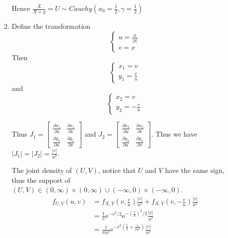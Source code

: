 \documentclass{article}
\begin{document}
\begin{enumerate}[leftmargin = 0 em, label = \arabic*., font = \bfseries]
\begin{enumerate}
Hence $\frac{X}{X+y} = U \sim Cauchy(x_0 = \frac{1}{2}, \gamma = \frac{1}{2})$


\item 
Define the transformation
\[\begin{cases}
	u = \frac{x}{|y|}\\
	v = x
\end{cases}\]
Then 
\[\begin{cases}
	x_1 = v\\
	y_1 = \frac{v}{u}
\end{cases}\]
and 
\[\begin{cases}
	x_2 = v\\
	y_2 = -\frac{v}{u}
\end{cases}\]


Thus $J_1 = \begin{bmatrix}
	\frac{\partial x_1}{\partial u} & \frac{\partial x_1}{\partial v}\\
	\frac{\partial y_1}{\partial u} & \frac{\partial y_1}{\partial v}
\end{bmatrix}$
and $J_2 = \begin{bmatrix}
	\frac{\partial x_2}{\partial u} & \frac{\partial x_2}{\partial v}\\
	\frac{\partial y_2}{\partial u} & \frac{\partial y_2}{\partial v}
\end{bmatrix}$. Thus we have $|J_1| = |J_2| = \frac{|v|}{u^2}$.

The joint density of $(U,V)$, notice that $U$ and $V$ have the same sign, thus the support of $(U,V) \in (0, \infty)\times(0, \infty) \cup (-\infty, 0)\times(-\infty, 0)$.
\begin{align*}
f_{U,V}(u,v) & = f_{X,Y}(v, \frac{v}{u}) \frac{|v|}{u^2} + f_{X,Y}(v, -\frac{v}{u})\frac{|v|}{u^2}\\
& = \frac{1}{\pi} \mathrm{e}^{- v^2 /2} \mathrm{e}^{-(\frac{v}{u})^2/2} \frac{|v|}{u^2}\\
& = \frac{1}{\pi u^2} \mathrm{e}^{-v^2 (\frac{1}{2} + \frac{1}{2 u^2})}\frac{|v|}{u^2}
\end{align*}


\end{enumerate}
\end{enumerate}
\end{document}
